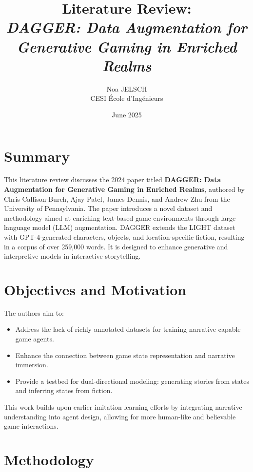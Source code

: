 \documentclass[12pt,a4paper]{article}
\title{Literature Review:\\\textit{DAGGER: Data Augmentation for Generative Gaming in Enriched Realms}}
\author{Noa JELSCH\\CESI École d'Ingénieurs}
\date{June 2025}
\begin{document}
\maketitle

\section*{Summary}

This literature review discusses the 2024 paper titled \textbf{DAGGER: Data Augmentation for Generative Gaming in Enriched Realms}, authored by Chris Callison-Burch, Ajay Patel, James Dennis, and Andrew Zhu from the University of Pennsylvania. The paper introduces a novel dataset and methodology aimed at enriching text-based game environments through large language model (LLM) augmentation. DAGGER extends the LIGHT dataset with GPT-4-generated characters, objects, and location-specific fiction, resulting in a corpus of over 259,000 words. It is designed to enhance generative and interpretive models in interactive storytelling.

\section*{Objectives and Motivation}

The authors aim to:
\begin{itemize}
  \item Address the lack of richly annotated datasets for training narrative-capable game agents.
  \item Enhance the connection between game state representation and narrative immersion.
  \item Provide a testbed for dual-directional modeling: generating stories from states and inferring states from fiction.
\end{itemize}
This work builds upon earlier imitation learning efforts by integrating narrative understanding into agent design, allowing for more human-like and believable game interactions.

\section*{Methodology}
\end{document}
